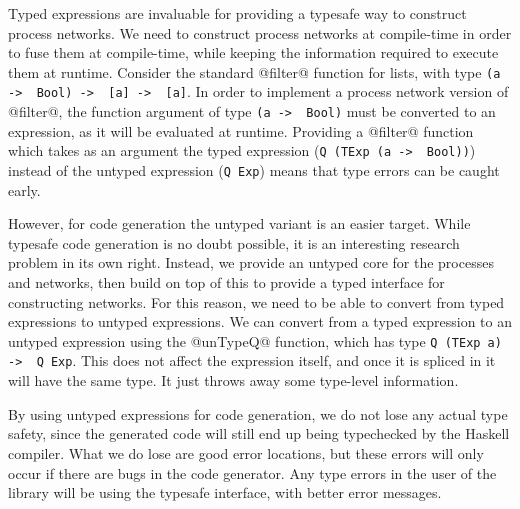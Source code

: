 Typed expressions are invaluable for providing a typesafe way to construct process networks.
We need to construct process networks at compile-time in order to fuse them at compile-time, while keeping the information required to execute them at runtime.
Consider the standard @filter@ function for lists, with type \lstinline/(a ->  Bool) ->  [a] ->  [a]/.
In order to implement a process network version of @filter@, the function argument of type \lstinline/(a ->  Bool)/ must be converted to an expression, as it will be evaluated at runtime.
Providing a @filter@ function which takes as an argument the typed expression (\lstinline/Q (TExp (a ->  Bool))/) instead of the untyped expression (\lstinline/Q Exp/) means that type errors can be caught early.

However, for code generation the untyped variant is an easier target.
While typesafe code generation is no doubt possible, it is an interesting research problem in its own right.
Instead, we provide an untyped core for the processes and networks, then build on top of this to provide a typed interface for constructing networks.
For this reason, we need to be able to convert from typed expressions to untyped expressions.
We can convert from a typed expression to an untyped expression using the @unTypeQ@ function, which has type \lstinline/Q (TExp a) ->  Q Exp/.
This does not affect the expression itself, and once it is spliced in it will have the same type.
It just throws away some type-level information.


By using untyped expressions for code generation, we do not lose any actual type safety, since the generated code will still end up being typechecked by the Haskell compiler.
What we do lose are good error locations, but these errors will only occur if there are bugs in the code generator.
Any type errors in the user of the library will be using the typesafe interface, with better error messages.


